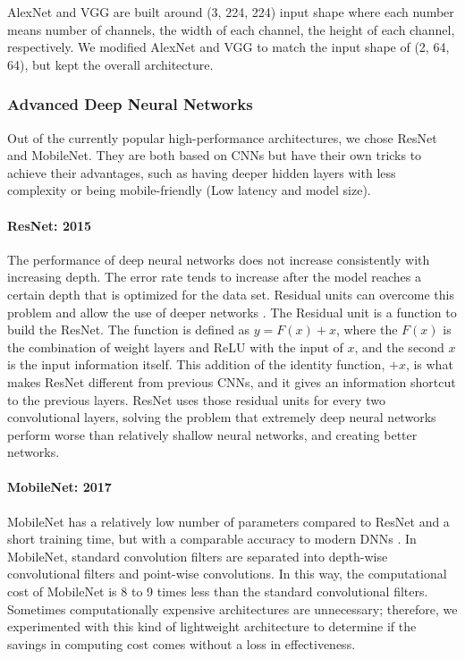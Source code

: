 \documentclass{aastex631}
\begin{document}
AlexNet and VGG are built around (3, 224, 224) input shape where each number means number of channels, the width of each channel, the height of each channel, respectively.
We modified AlexNet and VGG to match the input shape of (2, 64, 64), but kept the overall architecture.

\subsubsection{Advanced Deep Neural Networks}
\label{subsubsect:DNN}
Out of the currently popular high-performance architectures, we chose ResNet and MobileNet. They are both based on CNNs but have their own tricks to achieve their advantages, such as having deeper hidden layers with less complexity or being mobile-friendly (Low latency and model size).

\paragraph{ResNet: 2015}
\label{paragraph:ResNet}
The performance of deep neural networks does not increase consistently with increasing depth. 
The error rate tends to increase after the model reaches a certain depth that is optimized for the data set. 
Residual units can overcome this problem and allow the use of deeper networks \citep{he2015deep}. 
The Residual unit is a function to build the ResNet.
The function is defined as $y=F(x)+x$, where the $F(x)$ is the combination of weight layers and ReLU with the input of $x$, and the second $x$ is the input information itself.
This addition of the identity function, $+x$, is what makes ResNet different from previous CNNs, and it gives an information shortcut to the previous layers.
ResNet uses those residual units for every two convolutional layers, solving the problem that extremely deep neural networks perform worse than relatively shallow neural networks, and creating better networks.

\paragraph{MobileNet: 2017}
\label{paragraph:MobileNet}
MobileNet has a relatively low number of parameters compared to ResNet and a short training time, but with a comparable accuracy to modern DNNs \citep{howard2017mobilenets}.
In MobileNet, standard convolution filters are separated into depth-wise convolutional filters and point-wise convolutions. 
In this way, the computational cost of MobileNet is 8 to 9 times less than the standard convolutional filters. 
Sometimes computationally expensive architectures are unnecessary; therefore, we experimented with this kind of lightweight architecture to determine if the savings in computing cost comes without a loss in effectiveness.
\end{document}
